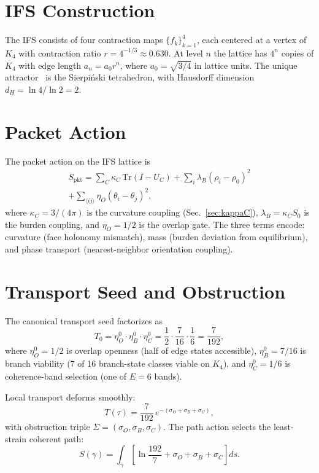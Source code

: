 \documentclass[11pt,twocolumn]{article}
\begin{document}
\section{IFS Construction}
\label{sec:IFS}

The IFS consists of four contraction maps $\{f_k\}_{k=1}^4$, each centered at a vertex of $K_4$ with contraction ratio $r=4^{-1/3}\approx 0.630$.
At level $n$ the lattice has $4^n$ copies of $K_4$ with edge length $a_n=a_0 r^n$, where $a_0=\sqrt{3/4}$ in lattice units.
The unique attractor~\cite{hutchinson1981} is the Sierpi\'nski tetrahedron, with Hausdorff dimension $d_H=\ln 4/\ln 2=2$.

\section{Packet Action}
\label{sec:action}

The packet action on the IFS lattice is
\begin{multline}
S_{\mathrm{pkt}} = \sum_C \kappa_C\,\mathrm{Tr}(I{-}U_C) + \sum_i \lambda_B(\rho_i{-}\rho_0)^2\\
+ \sum_{\langle ij\rangle}\eta_O(\theta_i{-}\theta_j)^2,
\label{eq:Spkt}
\end{multline}
where $\kappa_C=3/(4\pi)$ is the curvature coupling (Sec.~\ref{sec:kappaC}), $\lambda_B=\kappa_C S_0$ is the burden coupling, and $\eta_O=1/2$ is the overlap gate.
The three terms encode: curvature (face holonomy mismatch), mass (burden deviation from equilibrium), and phase transport (nearest-neighbor orientation coupling).

\section{Transport Seed and Obstruction}
\label{sec:transport}

The canonical transport seed factorizes as
\begin{equation}
T_0 = \eta_O^0\cdot\eta_B^0\cdot\eta_C^0 = \frac{1}{2}\cdot\frac{7}{16}\cdot\frac{1}{6} = \frac{7}{192},
\label{eq:seed}
\end{equation}
where $\eta_O^0=1/2$ is overlap openness (half of edge states accessible), $\eta_B^0=7/16$ is branch viability (7 of 16 branch-state classes viable on $K_4$), and $\eta_C^0=1/6$ is coherence-band selection (one of $E=6$ bands).

Local transport deforms smoothly:
\begin{equation}
T(\tau) = \frac{7}{192}\,e^{-(\sigma_O+\sigma_B+\sigma_C)},
\label{eq:deformed}
\end{equation}
with obstruction triple $\Sigma=(\sigma_O,\sigma_B,\sigma_C)$.
The path action selects the least-strain coherent path:
\begin{equation}
S(\gamma) = \int_\gamma\!\left[\ln\frac{192}{7}+\sigma_O+\sigma_B+\sigma_C\right]ds.
\label{eq:pathaction}
\end{equation}
\end{document}
